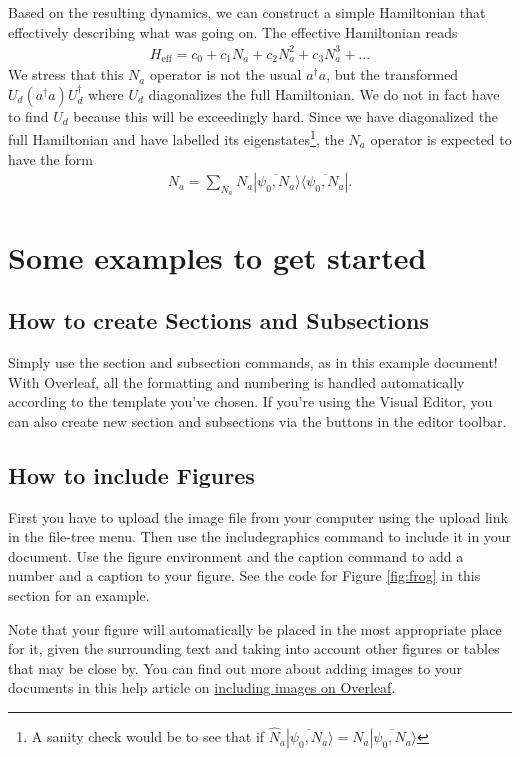 \documentclass{article}
\begin{document}
Based on the resulting dynamics, we can construct a simple Hamiltonian that effectively describing what was going on. The effective Hamiltonian reads
\begin{align}
    H_{\text{eff}} = c_0 + c_1 N_a + c_2 N_a^2 + c_3 N_a^3 + \dots
\end{align}
We stress that this $N_a$ operator is not the usual $a^\dagger a$, but the transformed $U_d (a^\dagger a) U_d^\dagger$ where $U_d$ diagonalizes the full Hamiltonian. We do not in fact have to find $U_d$ because this will be exceedingly hard. Since we have diagonalized the full Hamiltonian and have labelled its eigenstates\footnote{A sanity check would be to see that if $\hat{N}_a|\overline{\psi_0, N_a}\rangle = N_a|\overline{\psi_0, N_a}\rangle$}, the $N_a$ operator is expected to have the form
\begin{align}
    N_a = \sum_{N_a} N_a|\overline{\psi_0, N_a}\rangle\langle\overline{\psi_0, N_a}|.
\end{align}


\section{Some examples to get started}

\subsection{How to create Sections and Subsections}

Simply use the section and subsection commands, as in this example document! With Overleaf, all the formatting and numbering is handled automatically according to the template you've chosen. If you're using the Visual Editor, you can also create new section and subsections via the buttons in the editor toolbar.

\subsection{How to include Figures}

First you have to upload the image file from your computer using the upload link in the file-tree menu. Then use the includegraphics command to include it in your document. Use the figure environment and the caption command to add a number and a caption to your figure. See the code for Figure \ref{fig:frog} in this section for an example.

Note that your figure will automatically be placed in the most appropriate place for it, given the surrounding text and taking into account other figures or tables that may be close by. You can find out more about adding images to your documents in this help article on \href{https://www.overleaf.com/learn/how-to/Including_images_on_Overleaf}{including images on Overleaf}.
\end{document}
